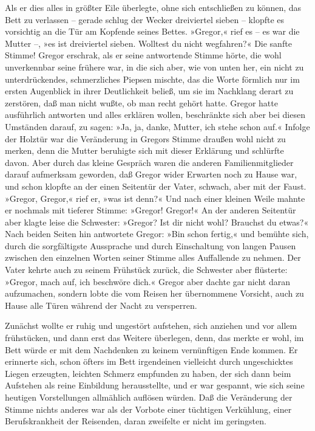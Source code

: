 Als er dies alles in größter Eile überlegte, ohne sich entschließen zu
können, das Bett zu verlassen -- gerade schlug der Wecker dreiviertel
sieben -- klopfte es vorsichtig an die Tür am Kopfende seines Bettes.
»Gregor,« rief es -- es war die Mutter --, »es ist dreiviertel sieben.
Wolltest du nicht wegfahren?« Die sanfte Stimme! Gregor erschrak, als er
seine antwortende Stimme hörte, die wohl unverkennbar seine frühere war,
in die sich aber, wie von unten her, ein nicht zu unterdrückendes,
schmerzliches Piepsen mischte, das die Worte förmlich nur im ersten
Augenblick in ihrer Deutlichkeit beließ, um sie im Nachklang derart zu
zerstören, daß man nicht wußte, ob man recht gehört hatte. Gregor hatte
ausführlich antworten und alles erklären wollen, beschränkte sich aber
bei diesen Umständen darauf, zu sagen: »Ja, ja, danke, Mutter, ich stehe
schon auf.« Infolge der Holztür war die Veränderung in Gregors Stimme
draußen wohl nicht zu merken, denn die Mutter beruhigte sich mit dieser
Erklärung und schlürfte davon. Aber durch das kleine Gespräch waren die
anderen Familienmitglieder darauf aufmerksam geworden, daß Gregor wider
Erwarten noch zu Hause war, und schon klopfte an der einen Seitentür der
Vater, schwach, aber mit der Faust. »Gregor, Gregor,« rief er, »was ist
denn?« Und nach einer kleinen Weile mahnte er nochmals mit tieferer
Stimme: »Gregor! Gregor!« An der anderen Seitentür aber klagte leise die
Schwester: »Gregor? Ist dir nicht wohl? Brauchst du etwas?« Nach beiden
Seiten hin antwortete Gregor: »Bin schon fertig,« und bemühte sich,
durch die sorgfältigste Aussprache und durch Einschaltung von langen
Pausen zwischen den einzelnen Worten seiner Stimme alles Auffallende zu
nehmen. Der Vater kehrte auch zu seinem Frühstück zurück, die Schwester
aber flüsterte: »Gregor, mach auf, ich beschwöre dich.« Gregor aber
dachte gar nicht daran aufzumachen, sondern lobte die vom Reisen her
übernommene Vorsicht, auch zu Hause alle Türen während der Nacht zu
versperren.

Zunächst wollte er ruhig und ungestört aufstehen, sich anziehen und vor
allem frühstücken, und dann erst das Weitere überlegen, denn, das merkte
er wohl, im Bett würde er mit dem Nachdenken zu keinem vernünftigen Ende
kommen. Er erinnerte sich, schon öfters im Bett irgendeinen vielleicht
durch ungeschicktes Liegen erzeugten, leichten Schmerz empfunden zu
haben, der sich dann beim Aufstehen als reine Einbildung herausstellte,
und er war gespannt, wie sich seine heutigen Vorstellungen allmählich
auflösen würden. Daß die Veränderung der Stimme nichts anderes war als
der Vorbote einer tüchtigen Verkühlung, einer Berufskrankheit der
Reisenden, daran zweifelte er nicht im geringsten.

